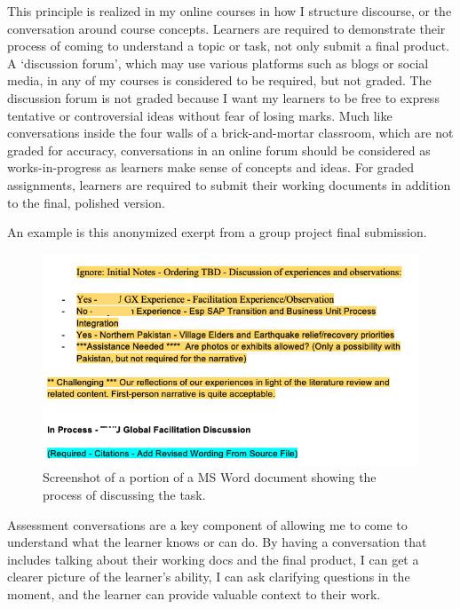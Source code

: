 \documentclass[
  letterpaper,
  DIV=11,
  numbers=noendperiod]{scrartcl}
\begin{document}
This principle is realized in my online courses in how I structure
discourse, or the conversation around course concepts. Learners are
required to demonstrate their process of coming to understand a topic or
task, not only submit a final product. A `discussion forum', which may
use various platforms such as blogs or social media, in any of my
courses is considered to be required, but not graded. The discussion
forum is not graded because I want my learners to be free to express
tentative or controversial ideas without fear of losing marks. Much like
conversations inside the four walls of a brick-and-mortar classroom,
which are not graded for accuracy, conversations in an online forum
should be considered as works-in-progress as learners make sense of
concepts and ideas. For graded assignments, learners are required to
submit their working documents in addition to the final, polished
version.

An example is this anonymized exerpt from a group project final
submission.

\begin{figure}[H]

{\centering \includegraphics{assets/screenshot-sample-doc.png}

}

\caption{Screenshot of a portion of a MS Word document showing the
process of discussing the task.}

\end{figure}%

Assessment conversations are a key component of allowing me to come to
understand what the learner knows or can do. By having a conversation
that includes talking about their working docs and the final product, I
can get a clearer picture of the learner's ability, I can ask clarifying
questions in the moment, and the learner can provide valuable context to
their work.
\end{document}
